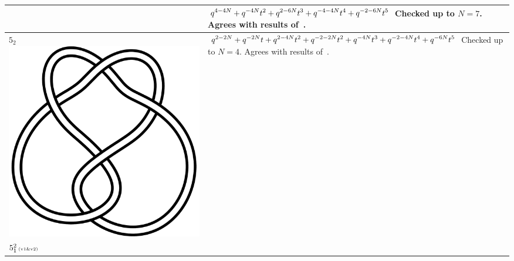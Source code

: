 \documentclass{compositio}
\theoremstyle{definition}
\numberwithin{equation}{section}
\begin{document}
{\begin{longtable}{p{}|p{}}
& 
\newline
$
\displaystyle{%
q^{4 - 4 N} + q^{-4 N} t^2 + q^{2 - 6 N} t^3 + q^{-4 - 4 N} t^4 +  q^{-2 - 6 N} t^5
}
$
\newline\newline\newline
Checked up to $N=7$. Agrees with results of~\cite{r0508510, r0607544}. 
\\
\hline
$5_{2}$ 
\includegraphics[scale=0.07,angle=0]{knot5_2.pdf} 
& 
\newline
$
\displaystyle{%
q^{2 - 2 N} + q^{-2 N} t + q^{2 - 4 N} t^2 + q^{-2 - 2 N} t^2 + q^{-4 N} t^3 + q^{-2 - 4 N} t^4 + q^{-6 N} t^5
}
$
\newline\newline\newline
Checked up to $N=4$. Agrees with results of~\cite{r0508510, r0607544}. 
\\
\hline
$5_{1}^2\,\text{{\tiny (v1\&v2)}}$ 

\end{longtable}}
\end{document}
